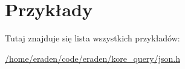 \section{Przykłady}
Tutaj znajduje się lista wszystkich przykładów\+:\begin{DoxyCompactItemize}
\item 
\hyperlink{_2home_2eraden_2code_2eraden_2kore_query_2json_8h-example}{/home/eraden/code/eraden/kore\+\_\+query/json.\+h}
\end{DoxyCompactItemize}
